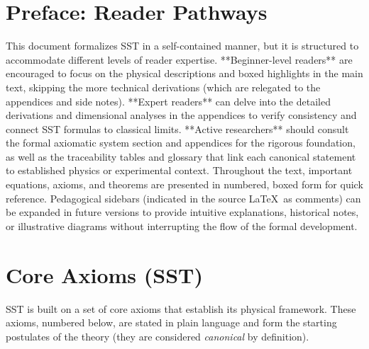 \documentclass[aps,onecolumn,10pt,nofootinbib]{revtex4}
\begin{document}
	\maketitle

	\section*{Preface: Reader Pathways}
	This document formalizes SST in a self-contained manner, but it is structured to accommodate different levels of reader expertise. **Beginner-level readers** are encouraged to focus on the physical descriptions and boxed highlights in the main text, skipping the more technical derivations (which are relegated to the appendices and side notes). **Expert readers** can delve into the detailed derivations and dimensional analyses in the appendices to verify consistency and connect SST formulas to classical limits. **Active researchers** should consult the formal axiomatic system section and appendices for the rigorous foundation, as well as the traceability tables and glossary that link each canonical statement to established physics or experimental context. Throughout the text, important equations, axioms, and theorems are presented in numbered, boxed form for quick reference. Pedagogical sidebars (indicated in the source \LaTeX~as comments) can be expanded in future versions to provide intuitive explanations, historical notes, or illustrative diagrams without interrupting the flow of the formal development.


	\section{Core Axioms (SST)}
	SST is built on a set of core axioms that establish its physical framework. These axioms, numbered below, are stated in plain language and form the starting postulates of the theory (they are considered \emph{canonical} by definition).
\end{document}
